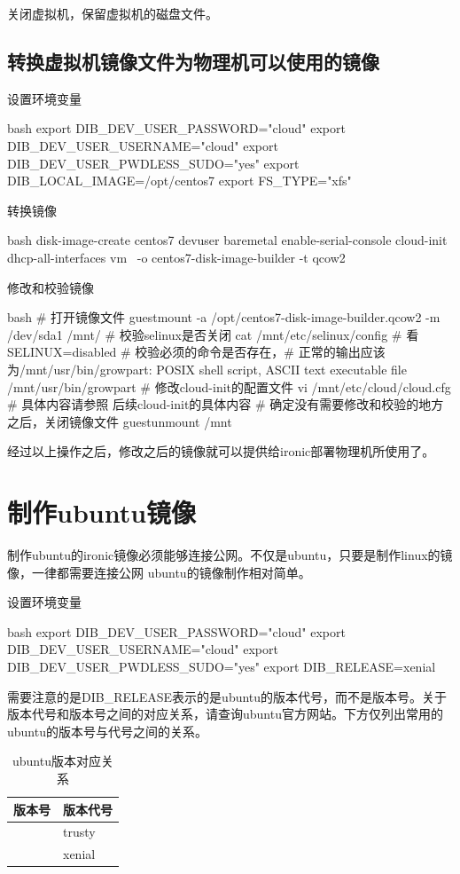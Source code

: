 关闭虚拟机，保留虚拟机的磁盘文件。

\subsection{转换虚拟机镜像文件为物理机可以使用的镜像}

设置环境变量
\begin{code-block}{bash}
export DIB_DEV_USER_PASSWORD="cloud"
export DIB_DEV_USER_USERNAME="cloud"
export DIB_DEV_USER_PWDLESS_SUDO="yes"
export DIB_LOCAL_IMAGE=/opt/centos7
export FS_TYPE="xfs"
\end{code-block}

转换镜像
\begin{code-block}{bash}
disk-image-create centos7 devuser baremetal enable-serial-console cloud-init dhcp-all-interfaces vm \
        -o centos7-disk-image-builder -t qcow2
\end{code-block}

修改和校验镜像
\begin{code-block}{bash}
# 打开镜像文件
guestmount -a /opt/centos7-disk-image-builder.qcow2 -m /dev/sda1 /mnt/
# 校验selinux是否关闭
cat /mnt/etc/selinux/config # 看SELINUX=disabled
# 校验必须的命令是否存在，# 正常的输出应该为/mnt/usr/bin/growpart: POSIX shell script, ASCII text executable
file /mnt/usr/bin/growpart
# 修改cloud-init的配置文件
vi /mnt/etc/cloud/cloud.cfg
# 具体内容请参照 后续cloud-init的具体内容
# 确定没有需要修改和校验的地方之后，关闭镜像文件
guestunmount /mnt
\end{code-block}

经过以上操作之后，修改之后的镜像就可以提供给ironic部署物理机所使用了。

\section{制作ubuntu镜像}
制作ubuntu的ironic镜像必须能够连接公网。不仅是ubuntu，只要是制作linux的镜像，一律都需要连接公网
ubuntu的镜像制作相对简单。

设置环境变量
\begin{code-block}{bash}
export DIB_DEV_USER_PASSWORD="cloud"
export DIB_DEV_USER_USERNAME="cloud"
export DIB_DEV_USER_PWDLESS_SUDO="yes"
export DIB_RELEASE=xenial
\end{code-block}

需要注意的是DIB\_RELEASE表示的是ubuntu的版本代号，而不是版本号。关于版本代号和版本号之间的对应关系，请查询ubuntu官方网站。下方仅列出常用的ubuntu的版本号与代号之间的关系。
\begin{table}[H]
  \centering
  \caption{ubuntu版本对应关系}
  \label{tab:ubuntu_edition_code}
  \begin{tabularx}{0.5\textwidth}{|X|X|}
  \hline
  \centering 版本号& \centering\arraybackslash 版本代号\\ \hline
  \centering 14.04 & \centering\arraybackslash trusty \\
  \centering 16.04 & \centering\arraybackslash xenial \\
  \hline
  \end{tabularx}
\end{table}

